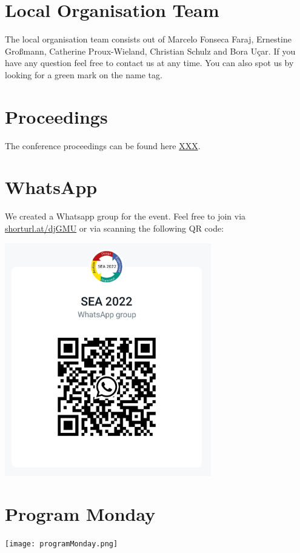 \documentclass{article}
\begin{document}
\section{Local Organisation Team}
The local organisation team consists out of Marcelo Fonseca Faraj, Ernestine Großmann, Catherine Proux-Wieland, Christian Schulz and Bora Uçar. If you have any question feel free to contact us at any time. You can also spot us by looking for a green mark on the name tag.

\section{Proceedings}
The conference proceedings can be found here \url{XXX}.
\vfill
\pagebreak
\section{WhatsApp}
We created a Whatsapp group for the event. Feel free to join via \url{shorturl.at/djGMU} or via scanning the following QR code:
\vspace*{1cm}

\begin{center}
        \includegraphics[width=9cm]{whatsapp.jpg}
\end{center}
\vfill
\pagebreak
\section{Program Monday}
\begin{center}
        \texttt{[image: programMonday.png]}
\end{center}
\vfill
\pagebreak
\end{document}
